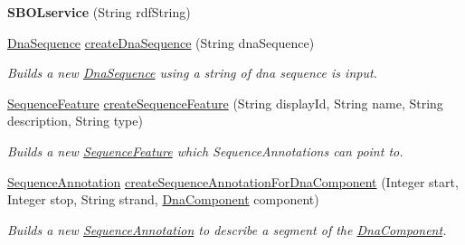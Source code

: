 \begin{DoxyCompactItemize}
\item 
\hypertarget{classorg_1_1sbolstandard_1_1lib_s_b_o_lj_1_1_s_b_o_lservice_a4cd9f9c9e23e6144278aaeb7d33aae52}{
{\bfseries SBOLservice} (String rdfString)}
\label{classorg_1_1sbolstandard_1_1lib_s_b_o_lj_1_1_s_b_o_lservice_a4cd9f9c9e23e6144278aaeb7d33aae52}

\item 
\hyperlink{classorg_1_1sbolstandard_1_1lib_s_b_o_lj_1_1_dna_sequence}{DnaSequence} \hyperlink{classorg_1_1sbolstandard_1_1lib_s_b_o_lj_1_1_s_b_o_lservice_a61e2cda6134ecedb3a5d0b92206b91a2}{createDnaSequence} (String dnaSequence)
\begin{DoxyCompactList}\small\item\em Builds a new \hyperlink{classorg_1_1sbolstandard_1_1lib_s_b_o_lj_1_1_dna_sequence}{DnaSequence} using a string of dna sequence is input. \item\end{DoxyCompactList}\item 
\hyperlink{classorg_1_1sbolstandard_1_1lib_s_b_o_lj_1_1_sequence_feature}{SequenceFeature} \hyperlink{classorg_1_1sbolstandard_1_1lib_s_b_o_lj_1_1_s_b_o_lservice_a5dab616a55f915c1ebaa6b244fb48fb5}{createSequenceFeature} (String displayId, String name, String description, String type)
\begin{DoxyCompactList}\small\item\em Builds a new \hyperlink{classorg_1_1sbolstandard_1_1lib_s_b_o_lj_1_1_sequence_feature}{SequenceFeature} which SequenceAnnotations can point to. \item\end{DoxyCompactList}\item 
\hyperlink{classorg_1_1sbolstandard_1_1lib_s_b_o_lj_1_1_sequence_annotation}{SequenceAnnotation} \hyperlink{classorg_1_1sbolstandard_1_1lib_s_b_o_lj_1_1_s_b_o_lservice_ab96b56fff36ffe4e728e749e0dcbef29}{createSequenceAnnotationForDnaComponent} (Integer start, Integer stop, String strand, \hyperlink{classorg_1_1sbolstandard_1_1lib_s_b_o_lj_1_1_dna_component}{DnaComponent} component)
\begin{DoxyCompactList}\small\item\em Builds a new \hyperlink{classorg_1_1sbolstandard_1_1lib_s_b_o_lj_1_1_sequence_annotation}{SequenceAnnotation} to describe a segment of the \hyperlink{classorg_1_1sbolstandard_1_1lib_s_b_o_lj_1_1_dna_component}{DnaComponent}. \item\end{DoxyCompactList}\item 

\end{DoxyCompactItemize}
